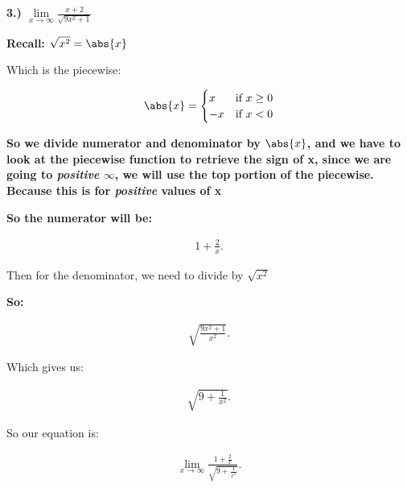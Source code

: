 \documentclass{report}
\begin{document}
        \bigbreak \noindent 
        \textbf{3.) $\lim\limits_{x \to \infty}{ \frac{x+2}{ \sqrt{9x^2+1}}}$}

        \bigbreak \noindent \bigbreak \noindent 
        \textbf{Recall: $\sqrt{x^2} = \abs{x}$}
        
        \bigbreak \noindent 
        Which is the piecewise:

           \begin{equation}
               \abs{x}=
                \begin{cases}
                    x & \text{if } x \geq 0  \\
                    -x & \text{if } x < 0
                \end{cases}
            \end{equation}

        \bigbreak \noindent 
        \textbf{So we divide numerator and denominator by $\abs{x}$, and we have to look at 
            the piecewise function to retrieve the sign of x, since we are going to \textbf{\textit{positive}}
            $\infty$, we will use the top portion of the piecewise. Because this is for \textbf{\textit{positive}} values 
            of x
        }

        \bigbreak \noindent 
        \textbf{So the numerator will be:}
        
        \begin{align*}
            1 + \frac{2}{x}
        .\end{align*}

        \bigbreak \noindent 
        Then for the denominator, we need to divide by $\sqrt{x^2}$

        \bigbreak \noindent 
        \textbf{So:}

        \begin{align*}
            \sqrt{ \frac{9x^2+1}{x^2}}
        .\end{align*}

        \bigbreak \noindent 
        Which gives us:

        \begin{align*}
            \sqrt{9 + \frac{1}{x^2}}
        .\end{align*}

        \bigbreak \noindent 
        So our equation is:

        \begin{align*}
            \lim\limits_{x \to \infty}{ \frac{1+ \frac{2}{x}}{ \sqrt{9+ \frac{1}{x^2}}}}
        .\end{align*}
\end{document}
